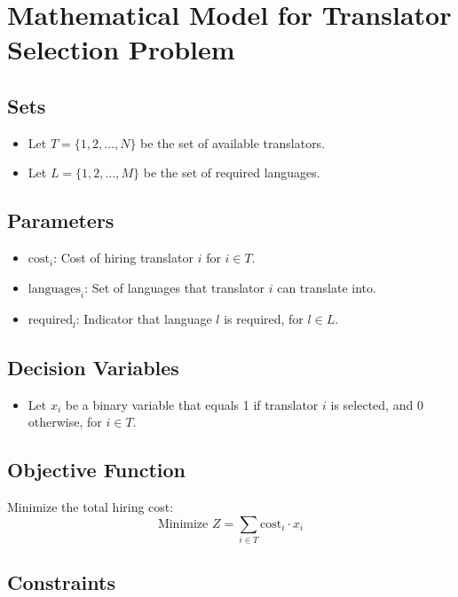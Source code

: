 \documentclass{article}
\begin{document}
\section*{Mathematical Model for Translator Selection Problem}

\subsection*{Sets}
\begin{itemize}
    \item Let \( T = \{1, 2, \ldots, N\} \) be the set of available translators.
    \item Let \( L = \{1, 2, \ldots, M\} \) be the set of required languages.
\end{itemize}

\subsection*{Parameters}
\begin{itemize}
    \item \( \text{cost}_i \): Cost of hiring translator \( i \) for \( i \in T \).
    \item \( \text{languages}_i \): Set of languages that translator \( i \) can translate into.
    \item \( \text{required}_l \): Indicator that language \( l \) is required, for \( l \in L \).
\end{itemize}

\subsection*{Decision Variables}
\begin{itemize}
    \item Let \( x_i \) be a binary variable that equals 1 if translator \( i \) is selected, and 0 otherwise, for \( i \in T \).
\end{itemize}

\subsection*{Objective Function}
Minimize the total hiring cost:
\[
\text{Minimize } Z = \sum_{i \in T} \text{cost}_i \cdot x_i
\]

\subsection*{Constraints}
\end{document}
